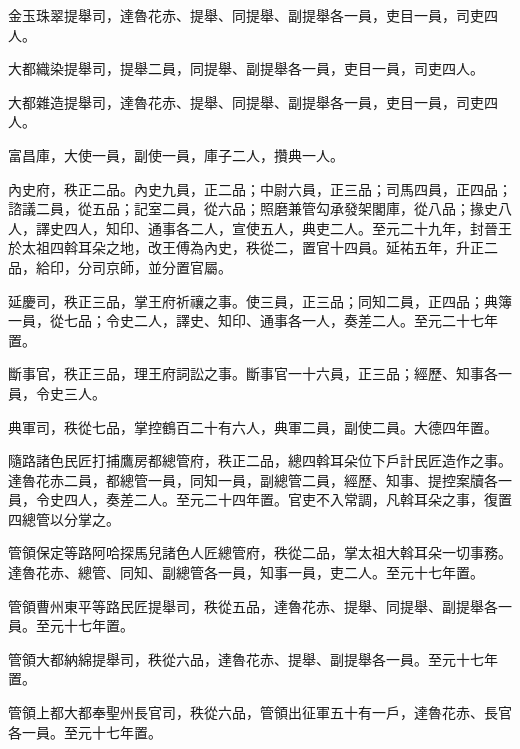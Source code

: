 \begin{pinyinscope}
 金玉珠翠提舉司，達魯花赤、提舉、同提舉、副提舉各一員，吏目一員，司吏四人。



 大都織染提舉司，提舉二員，同提舉、副提舉各一員，吏目一員，司吏四人。



 大都雜造提舉司，達魯花赤、提舉、同提舉、副提舉各一員，吏目一員，司吏四人。



 富昌庫，大使一員，副使一員，庫子二人，攢典一人。



 內史府，秩正二品。內史九員，正二品；中尉六員，正三品；司馬四員，正四品；諮議二員，從五品；記室二員，從六品；照磨兼管勾承發架閣庫，從八品；掾史八人，譯史四人，知印、通事各二人，宣使五人，典吏二人。至元二十九年，封晉王於太祖四斡耳朵之地，改王傅為內史，秩從二，置官十四員。延祐五年，升正二品，給印，分司京師，並分置官屬。



 延慶司，秩正三品，掌王府祈禳之事。使三員，正三品；同知二員，正四品；典簿一員，從七品；令史二人，譯史、知印、通事各一人，奏差二人。至元二十七年置。



 斷事官，秩正三品，理王府詞訟之事。斷事官一十六員，正三品；經歷、知事各一員，令史三人。



 典軍司，秩從七品，掌控鶴百二十有六人，典軍二員，副使二員。大德四年置。



 隨路諸色民匠打捕鷹房都總管府，秩正二品，總四斡耳朵位下戶計民匠造作之事。達魯花赤二員，都總管一員，同知一員，副總管二員，經歷、知事、提控案牘各一員，令史四人，奏差二人。至元二十四年置。官吏不入常調，凡斡耳朵之事，復置四總管以分掌之。



 管領保定等路阿哈探馬兒諸色人匠總管府，秩從二品，掌太祖大斡耳朵一切事務。達魯花赤、總管、同知、副總管各一員，知事一員，吏二人。至元十七年置。



 管領曹州東平等路民匠提舉司，秩從五品，達魯花赤、提舉、同提舉、副提舉各一員。至元十七年置。



 管領大都納綿提舉司，秩從六品，達魯花赤、提舉、副提舉各一員。至元十七年置。



 管領上都大都奉聖州長官司，秩從六品，管領出征軍五十有一戶，達魯花赤、長官各一員。至元十七年置。




\end{pinyinscope}
